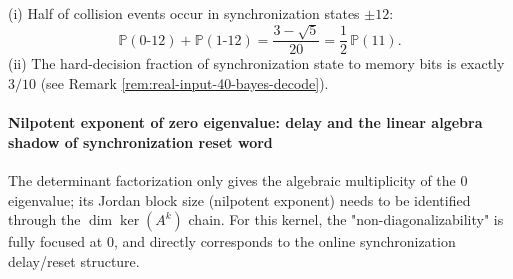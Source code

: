 \begin{remark}\label{rem:real-input-40-two-dyn-inferences}
(i) Half of collision events occur in synchronization states $\pm12$:
\[
\mathbb{P}(0\text{-}12)+\mathbb{P}(1\text{-}12)=\frac{3-\sqrt5}{20}=\frac12\,\mathbb{P}(11).
\]
(ii) The hard-decision fraction of synchronization state to memory bits is exactly $3/10$ (see Remark \ref{rem:real-input-40-bayes-decode}).
\end{remark}

\paragraph{Nilpotent exponent of zero eigenvalue: delay and the linear algebra shadow of synchronization reset word}
The determinant factorization only gives the algebraic multiplicity of the $0$ eigenvalue; its Jordan block size (nilpotent exponent) needs to be identified through the $\dim\ker(A^k)$ chain.
For this kernel, the "non-diagonalizability" is fully focused at $0$, and directly corresponds to the online synchronization delay/reset structure.


